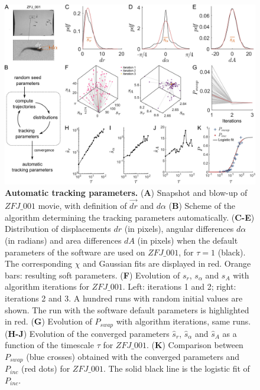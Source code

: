     \begin{figure}[h!]
    \centering
    \includegraphics[width=1\textwidth]{part_1/assets/Figure_5.png}
    \caption{{\bf Automatic tracking parameters.}
        (\textbf{A}) Snapshot and blow-up of $ZFJ\_001$ movie, with definition of $\vec{dr}$ and $d\alpha$
        (\textbf{B}) Scheme of the algorithm determining the tracking parameters automatically.
        (\textbf{C-E}) Distribution of displacements $dr$ (in pixels), angular differences $d\alpha$ (in radians) and area differences $dA$ (in pixels) when the default parameters of the software are used on $ZFJ\_001$, for $\tau=1$ (black). The corresponding $\chi$ and Gaussian fits are displayed in red. Orange bars: resulting soft parameters.
        (\textbf{F}) Evolution of $s_r$, $s_\alpha$ and $s_A$ with algorithm iterations for $ZFJ\_001$. Left: iterations 1 and 2; right: iterations 2 and 3. A hundred runs with random initial values are shown. The run with the software default parameters is highlighted in red.
        (\textbf{G}) Evolution of $P_{swap}$ with algorithm iterations, same runs.
        (\textbf{H-J}) Evolution of the converged parameters $\hat{s}_r$, $\hat{s}_\alpha$ and $\hat{s}_A$ as a function of the timescale $\tau$ for $ZFJ\_001$.
        (\textbf{K}) Comparison between $P_{swap}$ (blue crosses) obtained with the converged parameters and $P_{inc}$ (red dots) for $ZFJ\_001$. The solid black line is the logistic fit of $P_{inc}$.}
    \label{part_1:fig_5}
    \end{figure}

